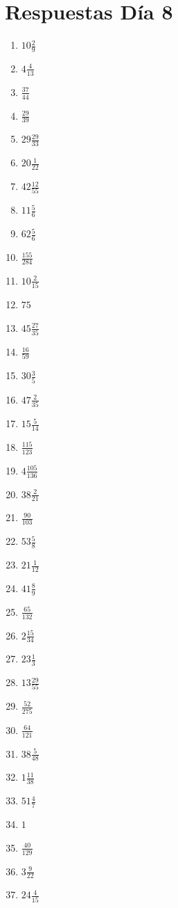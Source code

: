 \documentclass[12pt]{article}
\begin{document}
\section*{Respuestas Día 8}
\begin{enumerate}
\item $ 10 \frac{2}{9} $
\item $ 4 \frac{4}{13} $
\item $ \frac{37}{44} $
\item $ \frac{29}{39} $
\item $ 29 \frac{29}{33} $
\item $ 20 \frac{1}{22} $
\item $ 42 \frac{12}{55} $
\item $ 11 \frac{5}{6} $
\item $ 62 \frac{5}{6} $
\item $ \frac{155}{284} $
\item $ 10 \frac{2}{15} $
\item $ 75 $
\item $ 45 \frac{27}{35} $
\item $ \frac{16}{59} $
\item $ 30 \frac{3}{5} $
\item $ 47 \frac{2}{35} $
\item $ 15 \frac{5}{14} $
\item $ \frac{115}{123} $
\item $ 4 \frac{105}{136} $
\item $ 38 \frac{2}{21} $
\item $ \frac{90}{103} $
\item $ 53 \frac{5}{8} $
\item $ 21 \frac{1}{12} $
\item $ 41 \frac{8}{9} $
\item $ \frac{65}{132} $
\item $ 2 \frac{15}{34} $
\item $ 23 \frac{1}{3} $
\item $ 13 \frac{29}{55} $
\item $ \frac{52}{275} $
\item $ \frac{64}{121} $
\item $ 38 \frac{5}{48} $
\item $ 1 \frac{11}{38} $
\item $ 51 \frac{4}{7} $
\item $ 1 $
\item $ \frac{40}{129} $
\item $ 3 \frac{9}{22} $
\item $ 24 \frac{4}{15} $

\end{enumerate}
\end{document}
